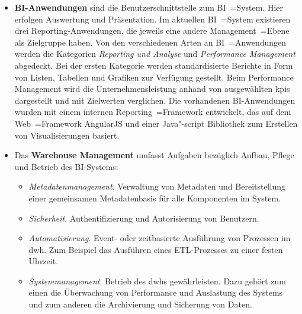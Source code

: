 \begin{itemize}
\item \textbf{BI-Anwendungen} sind die Benutzerschnittstelle zum BI~=System. Hier erfolgen Auswertung und Präsentation. Im aktuellen BI~=System existieren drei Reporting-Anwendungen, die jeweils eine andere Management~=Ebene als Zielgruppe haben. Von den verschiedenen Arten an BI~=Anwendungen werden die Kategorien \textit{Reporting und Analyse} und \textit{Performance Management} abgedeckt. Bei der ersten Kategorie werden standardisierte Berichte in Form von Listen, Tabellen und Grafiken zur Verfügung gestellt. Beim {Performance Management} wird die Unternehmensleistung anhand von ausgewählten \acp{kpi} dargestellt und mit Zielwerten verglichen. Die vorhandenen BI-Anwendungen wurden mit einem internen Reporting~=Framework entwickelt, das auf dem Web~=Framework AngularJS und einer Java"-script Bibliothek zum Erstellen von Visualisierungen basiert.
\item Das \textbf{Warehouse Management} umfasst Aufgaben bezüglich Aufbau, Pflege und Betrieb des BI-Systems:
\begin{itemize}
\item \textit{Metadatenmanagement}. Verwaltung von Metadaten und Bereitstellung einer gemeinsamen Metadatenbasis für alle Komponenten im System.
\item \textit{Sicherheit}. Authentifizierung und Autorisierung von Benutzern.
\item \textit{Automatisierung}. Event- oder zeitbasierte Ausführung von Prozessen im \ac{dwh}. Zum Beispiel das Ausführen eines ETL-Prozesses zu einer festen Uhrzeit.
\item \textit{Systemmanagement}. Betrieb des \ac{dwh}s gewährleisten. Dazu gehört zum einen die Überwachung von Performance und Auslastung des Systems und zum anderen die Archivierung und Sicherung von Daten.
\end{itemize}
\end{itemize}

